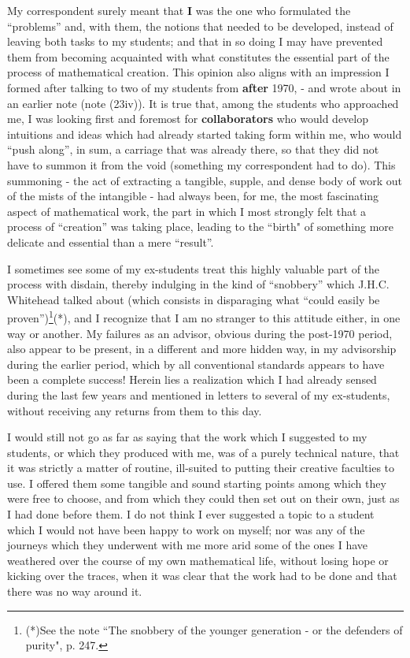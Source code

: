 My correspondent surely meant that \textbf{I} was the one who formulated the ``problems''
and, with them, the notions that needed to be developed, instead of 
leaving both tasks to my students; and that in so doing I may have 
prevented them from becoming acquainted with what constitutes the essential part of the process of mathematical creation. This opinion also aligns with an 
impression I formed after talking
to two of my students from \textbf{after} 1970, - and wrote about in an earlier note
(note (23iv)).
It is true that, among the students who approached me, I was looking first and foremost 
for \textbf{collaborators} 
who would develop intuitions and ideas which had already started taking form within me, 
who would ``push along'', in sum, a carriage that was already there, so that they did not have to
summon it from the void (something my correspondent had to do).
This summoning - the act of extracting a tangible, supple, 
and dense body of work out of the mists of the intangible - had always been, for me, the most
fascinating aspect of mathematical work, the part in which I most strongly felt
that a process of ``creation'' was taking place, leading to the ``birth"
of something more delicate and essential than a mere ``result''.

I sometimes see some of my ex-students treat this highly valuable part of the process with disdain, 
thereby indulging in the kind of ``snobbery'' which J.H.C. Whitehead talked about (which consists in disparaging 
what ``could easily be proven'')\footnote{(*)See the 
note ``The snobbery of the younger generation - or the defenders of purity",  p. 247.
}(*), 
and I recognize that I am no stranger to this attitude either, in one way or another. My failures as an advisor, obvious during the post-1970 period, also appear to be present, in a different and more hidden way, in my advisorship during the earlier period, which by all conventional standards appears to have been a complete success! Herein lies a realization which I had already sensed during the last few years and mentioned in letters to several of my ex-students, without receiving any returns from them to this day.

I would still not go as far as saying that the work which I suggested to my students, or which they produced with me, was of a purely technical nature, that it was strictly a matter of routine, ill-suited to putting their creative faculties to use. I offered them some tangible and sound starting points among which they were free to choose, and from which they could then set out on their own, just as I had done before them. I do not think I ever suggested a topic to a student which I would not have been happy to work on myself; nor was any of the journeys which they underwent with me more arid some of the ones I have weathered over the course of my own mathematical life, without losing hope or kicking over the traces, when it was clear that the work had to be done and that there was no way around it. 

